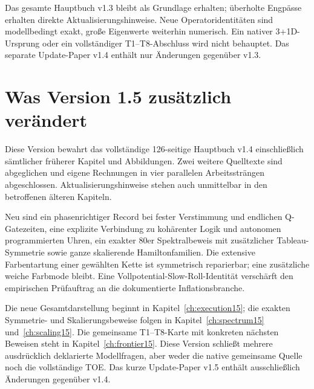 \documentclass[11pt,a4paper,oneside,parskip=half,headings=normal]{scrreprt}
\begin{document}
Das gesamte Hauptbuch v1.3 bleibt als Grundlage erhalten; überholte Engpässe erhalten direkte Aktualisierungshinweise. Neue Operatoridentitäten sind modellbedingt exakt, große Eigenwerte weiterhin numerisch. Ein nativer 3+1D-Ursprung oder ein vollständiger T1--T8-Abschluss wird nicht behauptet. Das separate Update-Paper v1.4 enthält nur Änderungen gegenüber v1.3.

\section*{Was Version 1.5 zusätzlich verändert}
Diese Version bewahrt das vollständige 126-seitige Hauptbuch v1.4 einschließlich sämtlicher früherer Kapitel und Abbildungen. Zwei weitere Quelltexte sind abgeglichen und eigene Rechnungen in vier parallelen Arbeitssträngen abgeschlossen. Aktualisierungshinweise stehen auch unmittelbar in den betroffenen älteren Kapiteln.

Neu sind ein phasenrichtiger Record bei fester Verstimmung und endlichen Q-Gatezeiten, eine explizite Verbindung zu kohärenter Logik und autonomen programmierten Uhren, ein exakter 80er Spektralbeweis mit zusätzlicher Tableau-Symmetrie sowie ganze skalierende Hamiltonfamilien. Die extensive Farbentartung einer gewählten Kette ist symmetrisch reparierbar; eine zusätzliche weiche Farbmode bleibt. Eine Vollpotential-Slow-Roll-Identität verschärft den empirischen Prüfauftrag an die dokumentierte Inflationsbranche.

Die neue Gesamtdarstellung beginnt in Kapitel~\ref{ch:execution15}; die exakten Symmetrie- und Skalierungsbeweise folgen in Kapitel~\ref{ch:spectrum15} und~\ref{ch:scaling15}. Die gemeinsame T1--T8-Karte mit konkreten nächsten Beweisen steht in Kapitel~\ref{ch:frontier15}. Diese Version schließt mehrere ausdrücklich deklarierte Modellfragen, aber weder die native gemeinsame Quelle noch die vollständige TOE. Das kurze Update-Paper v1.5 enthält ausschließlich Änderungen gegenüber v1.4.


\end{document}
